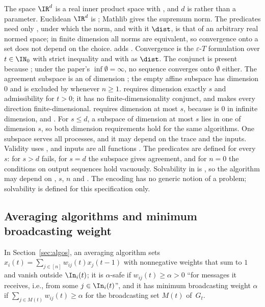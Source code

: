 The space $\IR^d$ is a real inner product space  with \lean{[FiniteDimensional ℝ V]}, and $d$ is  rather than a parameter. Euclidean $\IR^d$ is ; Mathlib gives  the supremum norm. The predicates need only \lean{[NormedSpace ℝ V]}, under which the norm, and with it $\dist$, is that of an arbitrary real normed space; in finite dimension all norms are equivalent, so convergence onto a set does not depend on the choice.  adds \lean{[FiniteDimensional ℝ V]}. Convergence is the $\varepsilon$-$T$ formulation over $t\in\IN_0$ with strict inequality and with  as $\dist$. The conjunct  is present because ; under the paper's $\inf\emptyset=\infty$, no sequence converges onto $\emptyset$ either. The agreement subspace is an  of dimension ; the empty affine subspace has dimension $0$ and is excluded by  whenever $n\geq1$.  requires dimension exactly $s$ and admissibility for $t>0$; it has no finite-dimensionality conjunct, and \lean{[FiniteDimensional ℝ V]} makes every direction finite-dimensional.  requires dimension at most $s$,  because  is $0$ in infinite dimension, and . For $s\leq d$, a subspace of dimension at most $s$ lies in one of dimension $s$, so both dimension requirements hold for the same algorithms. One subspace serves all processes, and it may depend on the trace and the inputs. Validity uses , and inputs are all functions . The predicates are defined for every $s$: for $s>d$  fails, for $s=d$ the subspace  gives agreement, and for $n=0$ the conditions on output sequences hold vacuously. Solvability in  is , so the algorithm may depend on , $s$, $n$ and . The encoding has no generic notion of a problem; solvability is defined for this specification only.

\subsection{Averaging algorithms and minimum broadcasting weight}\label{app:lean-averaging}

In Section~\ref{sec:algos}, an averaging algorithm sets $x_i(t)=\sum_{j\in[n]}w_{ij}(t)x_j(t-1)$ with nonnegative weights that sum to $1$ and vanish outside $\In_i(t)$; it is $\alpha$-safe if $w_{ij}(t)\geq\alpha>0$ ``for messages it receives, i.e., from some $j\in\In_i(t)$'', and it has minimum broadcasting weight $\alpha$ if $\sum_{j\in M(t)}w_{ij}(t)\geq\alpha$ for the broadcasting set $M(t)$ of~$G_t$.

